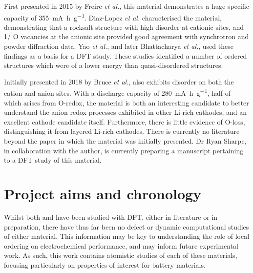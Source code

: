 \begin{labeling}{\textbf{}}
\item [\textbf{\ce{Li4Mn2O5}}] First presented in 2015 by Freire \textit{et al.},\cite{Freire2016a} this material demonstrates a huge specific capacity of \SI{355}{\milli\ampere\hour\per\gram}.
Diaz-Lopez \textit{et al.}\cite{Diaz-Lopez2018} characterised the material, demonstrating that a  rocksalt structure with high  disorder at cationic sites, and 1/ O vacancies at the anionic site provided good agreement with synchrotron and powder diffraction data.
Yao \textit{et al.}\cite{Diaz-Lopez2017}, and later Bhattacharya \textit{et al.}, used these findings as a basis for a DFT study.
These studies identified a number of ordered structures which were of a lower energy than quasi-disordered structures.

\item [\textbf{\ce{Li2MnO2F}}] Initially presented in 2018 by Bruce \textit{et al.},  also exhibits disorder on both the cation and anion sites.
With a discharge capacity of \SI{280}{\milli\ampere\hour\per\gram}, half of which arises from O-redox, the material is both an interesting candidate to better understand the anion redox processes exhibited in other Li-rich cathodes, and an excellent cathode candidate itself.
Furthermore, there is little evidence of O-loss, distinguishing it from layered Li-rich cathodes.
There is currently no literature beyond the paper in which the material was initially presented. 
Dr Ryan Sharpe, in collaboration with the author, is currently preparing a manuscript pertaining to a DFT study of this material.
\end{labeling}

\section{Project aims and chronology}
Whilst both  and  have been studied with DFT, either in literature or in preparation, there have thus far been no defect or dynamic computational studies of either material.
This information may be key to understanding the role of local ordering on electrochemical performance, and may inform future experimental work.
As such, this work contains atomistic studies of each of these materials, focusing particularly on properties of interest for battery materials.

